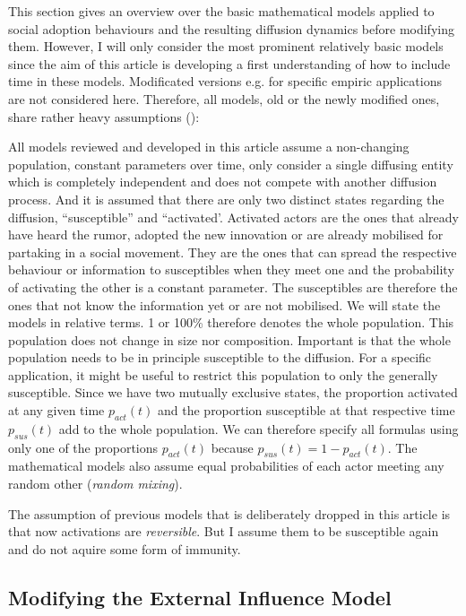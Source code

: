 \documentclass[a4paper,12pt]{article}
\begin{document}
This section gives an overview over the basic mathematical models applied to social adoption behaviours and the resulting diffusion dynamics before modifying them. However, I will only consider the most prominent relatively basic models since the aim of this article is developing a first understanding of how to include time in these models. Modificated versions e.g. for specific empiric applications are not considered here. Therefore, all models, old or the newly modified ones, share rather heavy assumptions (\cite[11ff]{mahajanNewProductDiffusion1990}):
    
All models reviewed and developed in this article assume a non-changing population, constant parameters over time, only consider a single diffusing entity which is completely independent and does not compete with another diffusion process. And it is assumed that there are only two distinct states regarding the diffusion, ``susceptible'' and ``activated'. Activated actors are the ones that already have heard the rumor, adopted the new innovation or are already mobilised for partaking in a social movement. They are the ones that can spread the respective behaviour or information to susceptibles when they meet one and the probability of activating the other is a constant parameter. The susceptibles are therefore the ones that not know the information yet or are not mobilised. We will state the models in relative terms. 1 or 100\% therefore denotes the whole population. This population does not change in size nor composition. Important is that the whole population needs to be in principle susceptible to the diffusion. For a specific application, it might be useful to restrict this population to only the generally susceptible. Since we have two mutually exclusive states, the proportion activated at any given time $p_{act}(t)$ and the proportion susceptible at that respective time $p_{sus}(t)$ add to the whole population. We can therefore specify all formulas using only one of the proportions $p_{act}(t)$ because $p_{sus}(t) = 1 - p_{act}(t)$. The mathematical models also assume equal probabilities of each actor meeting any random other (\textit{random mixing}). 

The assumption of previous models that is deliberately dropped in this article is that now activations are \textit{reversible}. But I assume them to be susceptible again and do not aquire some form of immunity.


\subsection{Modifying the External Influence Model}
\end{document}
